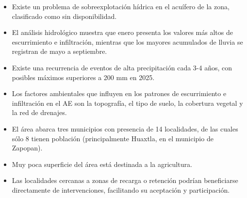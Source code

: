 \documentclass[12pt,letterpaper]{article}
\begin{document}
\begin{itemize}
    \item Existe un problema de sobreexplotación hídrica en el acuífero de la zona, clasificado como sin disponibilidad.
    \item El análisis hidrológico muestra que enero presenta los valores más altos de escurrimiento e infiltración, mientras que los mayores acumulados de lluvia se registran de mayo a septiembre.
    \item Existe una recurrencia de eventos de alta precipitación cada 3-4 años, con posibles máximos superiores a 200 mm en 2025.
    \item Los factores ambientales que influyen en los patrones de escurrimiento e infiltración en el AE son la topografía, el tipo de suelo, la cobertura vegetal y la red de drenajes.
    \item El área abarca tres municipios con presencia de 14 localidades, de las cuales sólo 8 tienen población (principalmente Huaxtla, en el municipio de Zapopan).
    \item Muy poca superficie del área está destinada a la agricultura.
    \item Las localidades cercanas a zonas de recarga o retención podrían beneficiarse directamente de intervenciones, facilitando su aceptación y participación.

\end{itemize}
\end{document}
